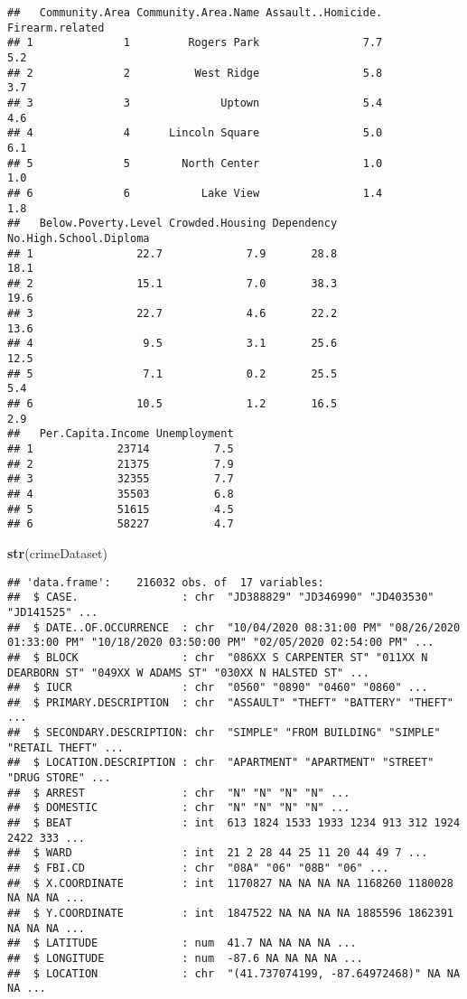 \documentclass[
]{article}
\newenvironment{Shaded}{\begin{snugshade}}{\end{snugshade}}
\newcommand{\KeywordTok}[1]{\textcolor[rgb]{0.13,0.29,0.53}{\textbf{#1}}}
\newcommand{\NormalTok}[1]{#1}
\begin{document}
\begin{verbatim}
##   Community.Area Community.Area.Name Assault..Homicide. Firearm.related
## 1              1         Rogers Park                7.7             5.2
## 2              2          West Ridge                5.8             3.7
## 3              3              Uptown                5.4             4.6
## 4              4      Lincoln Square                5.0             6.1
## 5              5        North Center                1.0             1.0
## 6              6           Lake View                1.4             1.8
##   Below.Poverty.Level Crowded.Housing Dependency No.High.School.Diploma
## 1                22.7             7.9       28.8                   18.1
## 2                15.1             7.0       38.3                   19.6
## 3                22.7             4.6       22.2                   13.6
## 4                 9.5             3.1       25.6                   12.5
## 5                 7.1             0.2       25.5                    5.4
## 6                10.5             1.2       16.5                    2.9
##   Per.Capita.Income Unemployment
## 1             23714          7.5
## 2             21375          7.9
## 3             32355          7.7
## 4             35503          6.8
## 5             51615          4.5
## 6             58227          4.7
\end{verbatim}

\begin{Shaded}
\begin{Highlighting}[]
\KeywordTok{str}\NormalTok{(crimeDataset)}
\end{Highlighting}
\end{Shaded}

\begin{verbatim}
## 'data.frame':    216032 obs. of  17 variables:
##  $ CASE.                : chr  "JD388829" "JD346990" "JD403530" "JD141525" ...
##  $ DATE..OF.OCCURRENCE  : chr  "10/04/2020 08:31:00 PM" "08/26/2020 01:33:00 PM" "10/18/2020 03:50:00 PM" "02/05/2020 02:54:00 PM" ...
##  $ BLOCK                : chr  "086XX S CARPENTER ST" "011XX N DEARBORN ST" "049XX W ADAMS ST" "030XX N HALSTED ST" ...
##  $ IUCR                 : chr  "0560" "0890" "0460" "0860" ...
##  $ PRIMARY.DESCRIPTION  : chr  "ASSAULT" "THEFT" "BATTERY" "THEFT" ...
##  $ SECONDARY.DESCRIPTION: chr  "SIMPLE" "FROM BUILDING" "SIMPLE" "RETAIL THEFT" ...
##  $ LOCATION.DESCRIPTION : chr  "APARTMENT" "APARTMENT" "STREET" "DRUG STORE" ...
##  $ ARREST               : chr  "N" "N" "N" "N" ...
##  $ DOMESTIC             : chr  "N" "N" "N" "N" ...
##  $ BEAT                 : int  613 1824 1533 1933 1234 913 312 1924 2422 333 ...
##  $ WARD                 : int  21 2 28 44 25 11 20 44 49 7 ...
##  $ FBI.CD               : chr  "08A" "06" "08B" "06" ...
##  $ X.COORDINATE         : int  1170827 NA NA NA NA 1168260 1180028 NA NA NA ...
##  $ Y.COORDINATE         : int  1847522 NA NA NA NA 1885596 1862391 NA NA NA ...
##  $ LATITUDE             : num  41.7 NA NA NA NA ...
##  $ LONGITUDE            : num  -87.6 NA NA NA NA ...
##  $ LOCATION             : chr  "(41.737074199, -87.64972468)" NA NA NA ...
\end{verbatim}
\end{document}

